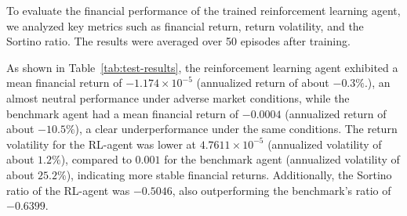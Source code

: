 
To evaluate the financial performance of the trained reinforcement learning agent, we analyzed key metrics such as
financial return, return volatility, and the Sortino ratio.
The results were averaged over 50 episodes after training.

As shown in Table~\ref{tab:test-results}, the reinforcement learning agent exhibited a mean financial return of $-1.174 \times 10^{-5}$
(annualized return of about $-0.3\%$.), an almost neutral performance under adverse market conditions,
while the benchmark agent had a mean financial return of $-0.0004$ (annualized return of about $-10.5\%$),
a clear underperformance under the same conditions.
The return volatility for the RL-agent was lower at $4.7611 \times 10^{-5}$ (annualized volatility of about $1.2\%$),
compared to $0.001$ for the benchmark agent (annualized volatility of about $25.2\%$), indicating more stable financial returns.
Additionally, the Sortino ratio of the RL-agent was $-0.5046$, also outperforming the benchmark's ratio of $-0.6399$.

